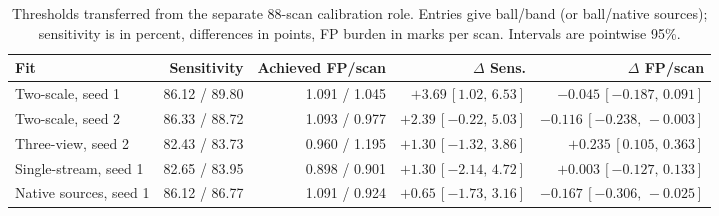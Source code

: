 \begin{table}[!t]
\centering
\small
\caption{Thresholds transferred from the separate 88-scan calibration role. Entries give ball/band (or ball/native sources); sensitivity is in percent, differences in points, FP burden in marks per scan. Intervals are pointwise 95\%.}
\label{tab:transfer}
\begin{tabular}{@{}lrrrr@{}}
\toprule
Fit & Sensitivity & Achieved FP/scan & $\Delta$ Sens. & $\Delta$ FP/scan \\
\midrule
Two-scale, seed 1 & 86.12 / 89.80 & 1.091 / 1.045 & $+3.69\,[1.02,\,6.53]$ & $-0.045\,[-0.187,\,0.091]$ \\
Two-scale, seed 2 & 86.33 / 88.72 & 1.093 / 0.977 & $+2.39\,[-0.22,\,5.03]$ & $-0.116\,[-0.238,\,-0.003]$ \\
Three-view, seed 2 & 82.43 / 83.73 & 0.960 / 1.195 & $+1.30\,[-1.32,\,3.86]$ & $+0.235\,[0.105,\,0.363]$ \\
Single-stream, seed 1 & 82.65 / 83.95 & 0.898 / 0.901 & $+1.30\,[-2.14,\,4.72]$ & $+0.003\,[-0.127,\,0.133]$ \\
Native sources, seed 1 & 86.12 / 86.77 & 1.091 / 0.924 & $+0.65\,[-1.73,\,3.16]$ & $-0.167\,[-0.306,\,-0.025]$ \\
\bottomrule
\end{tabular}
\end{table}
